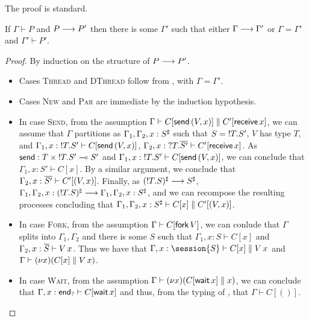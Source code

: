 \documentclass[orivec,envcountsame]{llncs}
\begin{document}
\noindent
The proof is standard.

\begin{theorem}\label{thm:preservation}
  If $\Gamma \vdash P$ and $P \longrightarrow P'$ then there is some $\Gamma'$ such that either $\Gamma
  \longrightarrow \Gamma'$ or $\Gamma = \Gamma'$ and $\Gamma' \vdash P'$.
\end{theorem}

\begin{proof}
  By induction on the structure of $P \longrightarrow P'$.
  \begin{itemize}
  \item Cases \textsc{Thread} and \textsc{DThread} follow from , with
    $\Gamma = \Gamma'$.
  \item Cases \textsc{New} and \textsc{Par} are immediate by the induction hypothesis.
  \item In case \textsc{Send}, from the assumption $\Gamma \vdash C[\mathsf{send}\,(V,x)] \parallel
    C'[\mathsf{receive} \, x]$, we can assume that $\Gamma$ partitions as
    $\Gamma_1,\Gamma_2,x:S^\sharp$ such that $S = {!T.S'}$, $V$ has type $T$, and
    $\Gamma_1,x:{!T.S'} \vdash C[\mathsf{send} \, (V,x)]$,
    $\Gamma_2,x:{?T.\overline{S'}} \vdash C'[\mathsf{receive} \, x]$.  As $\mathsf{send} : T
    \times {!T.S'} \multimap S'$ and $\Gamma_1,x:{!T.S'} \vdash C[\mathsf{send} \,
    (V,x)]$, we can conclude that $\Gamma_1,x:S' \vdash C[x]$.  By a similar argument, we conclude
    that $\Gamma_2,x:\overline{S'} \vdash C'[(V,x)]$. Finally, as $({!T.S})^\sharp \longrightarrow
    S^\sharp$, $\Gamma_1,\Gamma_2,x:({!T.S})^\sharp \longrightarrow
    \Gamma_1,\Gamma_2,x:S^\sharp$, and we can recompose the resulting processes concluding that
    $\Gamma_1,\Gamma_2,x:S^\sharp \vdash C[x] \parallel C'[(V,x)]$.
  \item In case \textsc{Fork}, from the assumption $\Gamma \vdash C[\mathsf{fork} \, V]$, we can
    conlude that $\Gamma$ splits into $\Gamma_1,\Gamma_2$ and there is some $S$ such that
    $\Gamma_1,x:S \vdash C[x]$ and $\Gamma_2,x:\overline{S} \vdash V \, x$.  Thus we have that
    $\Gamma,x:\session{S} \vdash C[x] \parallel V \app x$ and $\Gamma \vdash (\nu x)(C[x] \parallel
    V \, x)$.
  \item In case \textsc{Wait}, from the assumption $\Gamma \vdash (\nu x)(C[\mathsf{wait} \,
    x] \parallel x)$, we can conclude that $\Gamma,x:\mathsf{end}_? \vdash C[\mathsf{wait} \, x]$ and
    thus, from the typing of , that $\Gamma \vdash C[()]$.

\end{itemize}
\end{proof}
\end{document}
